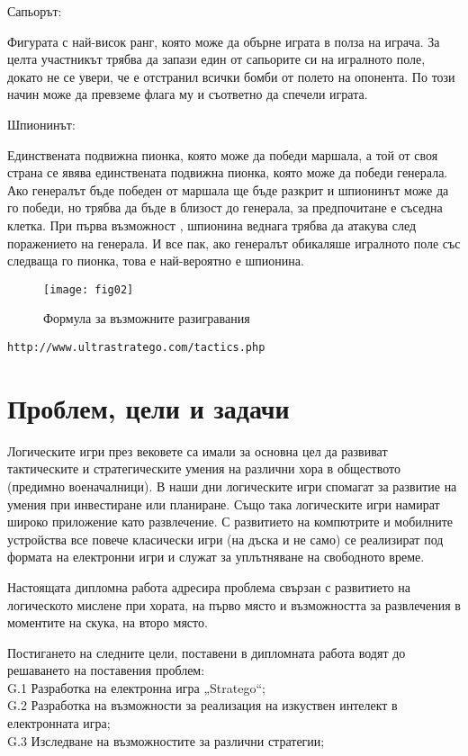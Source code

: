 Сапьорът:

Фигурата с най-висок ранг, която може да обърне играта в полза на играча. За целта участникът трябва да запази един от сапьорите си на игралното поле, докато не се увери, че е отстранил всички бомби от полето на опонента. По този начин може да превземе флага му и съответно да спечели играта.

Шпионинът:

Единствената подвижна пионка, която може да победи маршала, а той от своя страна се явява единствената подвижна пионка, която може да победи генерала. Ако генералът бъде победен от маршала ще бъде разкрит и шпионинът може да го победи, но трябва да бъде в близост до генерала, за предпочитане е съседна клетка. При първа възможност , шпионина веднага трябва  да атакува след поражението на генерала. И все пак, ако генералът обикаляше игралното поле със следваща го пионка, това е най-вероятно е шпионина.

\begin{figure}[h!]
 \centering
 \texttt{[image: fig02]}
 \caption{Формула за възможните разигравания \cite{arts01}}
\label{figure02}
\end{figure}
\FloatBarrier

\begin{lstlisting}
http://www.ultrastratego.com/tactics.php
\end{lstlisting}

\section{Проблем, цели и задачи}

Логическите игри през вековете са имали за основна цел да развиват тактическите и стратегическите умения на различни хора в обществото (предимно военачалници). В наши дни логическите игри спомагат за развитие на умения при инвестиране или планиране. Също така логическите игри намират широко приложение като развлечение. С развитието на компютрите и мобилните устройства все повече класически игри (на дъска и не само) се реализират под формата на електронни игри и служат за уплътняване на свободното време. 

Настоящата дипломна работа адресира проблема свързан с развитието на логическото мислене при хората, на първо място и възможността за развлечения в моментите на скука, на второ място. 

Постигането на следните цели, поставени в дипломната работа водят до решаването на поставения проблем: \\
G.1 Разработка на електронна игра „Stratego“; \\
G.2 Разработка на възможности за реализация на изкуствен интелект в електронната игра; \\
G.3 Изследване на възможностите за различни стратегии;

